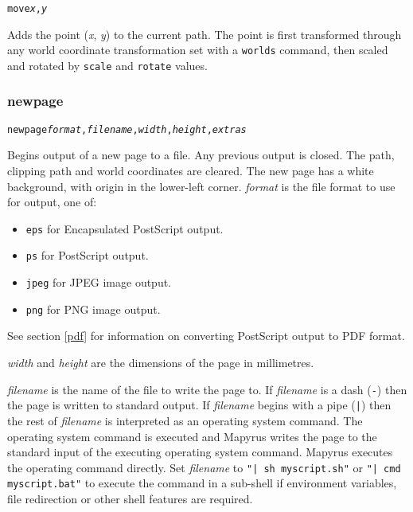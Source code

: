 \begin{alltt}
move \textit{x}, \textit{y}
\end{alltt}

Adds the point (\textit{x}, \textit{y}) to the current path.  The
point is first transformed through any world coordinate
transformation set with a \texttt{worlds} command,
then scaled and rotated by \texttt{scale}
and \texttt{rotate} values.

\subsubsection{newpage}

\begin{alltt}
newpage \textit{format}, \textit{filename}, \textit{width}, \textit{height}, \textit{extras}
\end{alltt}

Begins output of a new page to a file.  Any previous output is closed.  The
path, clipping path and world coordinates are cleared.  The new page has a
white background, with origin in the lower-left corner.  \textit{format} is the
file format to use for output, one of:

\begin{itemize}
\item
\texttt{eps} for Encapsulated PostScript output.
\item
\texttt{ps} for PostScript output.
\item
\texttt{jpeg} for JPEG image output.
\item
\texttt{png} for PNG image output.
\end{itemize}

See section \ref{pdf} for
information on converting PostScript output to PDF format.

\textit{width} and \textit{height} are the dimensions of the page
in millimetres.

\textit{filename} is the name of the file to write the page to.
If \textit{filename} is a dash (\texttt{-})
then the page is written to standard output.
If \textit{filename} begins with a pipe (\texttt{|}) then the rest
of \textit{filename} is interpreted as an operating system
command.  The operating system command is executed and Mapyrus
writes the page to the standard input of the executing
operating system command.
Mapyrus executes the operating command directly.  Set \textit{filename} to
\texttt{"| sh myscript.sh"}
or
\texttt{"| cmd myscript.bat"}
to execute the command in a sub-shell if 
environment variables, file redirection or other shell features are
required.

